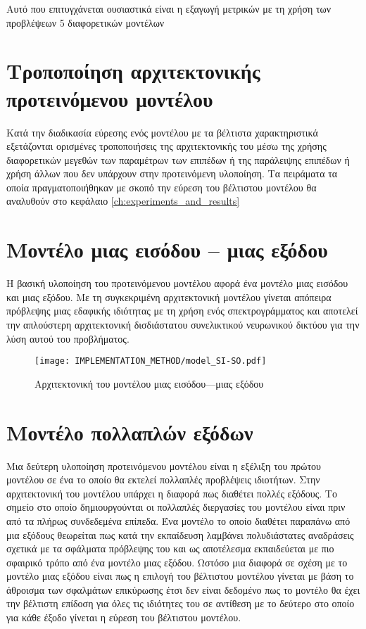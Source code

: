 Αυτό που επιτυγχάνεται ουσιαστικά είναι η εξαγωγή μετρικών με τη χρήση των προβλέψεων 5 διαφορετικών μοντέλων

\section{Τροποποίηση αρχιτεκτονικής προτεινόμενου μοντέλου}
Κατά την διαδικασία εύρεσης ενός μοντέλου με τα βέλτιστα χαρακτηριστικά εξετάζονται ορισμένες τροποποιήσεις της αρχιτεκτονικής του μέσω της χρήσης διαφορετικών μεγεθών των παραμέτρων των επιπέδων ή της παράλειψης επιπέδων ή χρήση άλλων που δεν υπάρχουν στην προτεινόμενη υλοποίηση. Τα πειράματα τα οποία πραγματοποιήθηκαν με σκοπό την εύρεση του βέλτιστου μοντέλου θα αναλυθούν στο κεφάλαιο \ref{ch:experiments_and_results}

\section{Μοντέλο μιας εισόδου -- μιας εξόδου}
Η βασική υλοποίηση του προτεινόμενου μοντέλου αφορά ένα μοντέλο μιας εισόδου και μιας εξόδου. Με τη συγκεκριμένη αρχιτεκτονική μοντέλου γίνεται απόπειρα πρόβλεψης μιας εδαφικής ιδιότητας με τη χρήση ενός σπεκτρογράμματος και αποτελεί την απλούστερη αρχιτεκτονική δισδιάστατου συνελικτικού νευρωνικού δικτύου για την λύση αυτού του προβλήματος.
\begin{figure}[H]
  \begin{center}
    \texttt{[image: IMPLEMENTATION\_METHOD/model\_SI-SO.pdf]}
    \caption{Αρχιτεκτονική του μοντέλου μιας εισόδου---μιας εξόδου}
  \end{center}
\end{figure}
\section{Μοντέλο πολλαπλών εξόδων}
Μια δεύτερη υλοποίηση προτεινόμενου μοντέλου είναι η εξέλιξη του πρώτου μοντέλου σε ένα το οποίο θα εκτελεί πολλαπλές προβλέψεις ιδιοτήτων. Στην αρχιτεκτονική του μοντέλου υπάρχει η διαφορά πως διαθέτει πολλές εξόδους. Το σημείο στο οποίο δημιουργούνται οι πολλαπλές διεργασίες του μοντέλου είναι πριν από τα πλήρως συνδεδεμένα επίπεδα. Ένα μοντέλο το οποίο διαθέτει παραπάνω από μια εξόδους θεωρείται πως κατά την εκπαίδευση λαμβάνει πολυδιάστατες αναδράσεις σχετικά με τα σφάλματα πρόβλεψης του και ως αποτέλεσμα εκπαιδεύεται με πιο σφαιρικό τρόπο από ένα μοντέλο μιας εξόδου. Ωστόσο μια διαφορά σε σχέση με το μοντέλο μιας εξόδου είναι πως η επιλογή του βέλτιστου μοντέλου γίνεται με βάση το άθροισμα των σφαλμάτων επικύρωσης έτσι δεν είναι δεδομένο πως το μοντέλο θα έχει την βέλτιστη επίδοση για όλες τις ιδιότητες του σε αντίθεση με το δεύτερο στο οποίο για κάθε έξοδο γίνεται η εύρεση του βέλτιστου μοντέλου.

